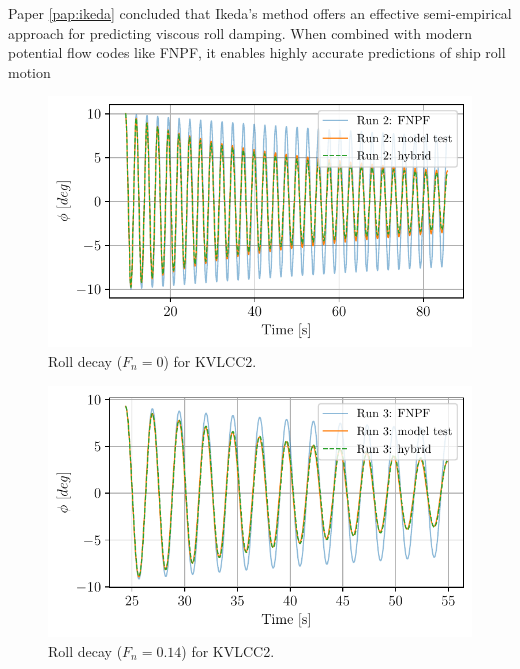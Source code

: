 Paper \ref{pap:ikeda} concluded that Ikeda's method offers an effective semi-empirical approach for predicting viscous roll damping. When combined with modern potential flow codes like FNPF, it enables highly accurate predictions of ship roll motion 
\begin{figure}[h]
\center
\includegraphics[width=\textwidth]{figures/hybrid_0_time.pdf}
\caption{Roll decay ($F_n=0$) for KVLCC2.}
\label{fig:hybrid_0_time}
\end{figure}
\begin{figure}[h]
\center
\includegraphics[width=\textwidth]{figures/hybrid_speed_time.pdf}
\caption{Roll decay ($F_n=0.14$) for KVLCC2.}
\label{fig:hybrid_speed_time}
\end{figure}
